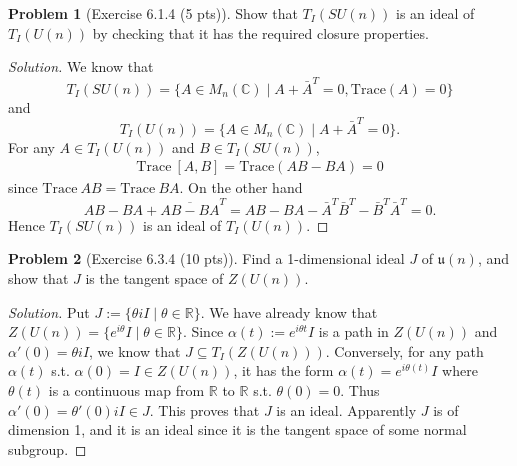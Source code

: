 \documentclass{article}
\theoremstyle{definition}
\newtheorem{problem}{Problem}
\theoremstyle{plain}
\begin{document}
\begin{problem}[Exercise 6.1.4 (5 pts)]
Show that $T_I(SU(n))$ is an ideal of $T_I(U(n))$ by checking that it has the required closure properties.
\end{problem}
\begin{adjustwidth}{0.7cm}{}
\color{blue}
\begin{proof}[Solution]
We know that
\begin{displaymath}
T_I(SU(n))=\{A\in M_n(\mathbb{C})\mid A+\bar{A}^T=0,\mathrm{Trace}(A)=0\}
\end{displaymath}
and
\begin{displaymath}
T_I(U(n))=\{A\in M_n(\mathbb{C})\mid A+\bar{A}^T=0\}.
\end{displaymath}
For any $A\in T_I(U(n))$ and $B\in T_I(SU(n))$,
\begin{align*}
\mathrm{Trace}~[A,B]=\mathrm{Trace}(AB-BA)=0
\end{align*}
since $\mathrm{Trace}~AB=\mathrm{Trace}~BA$. On the other hand
\begin{displaymath}
AB-BA+\overline{AB-BA}^T=AB-BA-\bar{A}^T\bar{B}^T-\bar{B}^T\bar{A}^T=0.
\end{displaymath}
Hence $T_I(SU(n))$ is an ideal of $T_I(U(n))$.
\color{black}
\end{proof}
\end{adjustwidth}

\begin{problem}[Exercise 6.3.4 (10 pts)]
Find a 1-dimensional ideal $J$ of $\mathfrak{u}(n)$, and show that $J$ is the tangent space of $Z(U(n))$.
\end{problem}
\begin{adjustwidth}{0.7cm}{}
\color{blue}
\begin{proof}[Solution]
Put $J:=\{\theta iI\mid\theta\in\mathbb{R}\}$. We have already know that $Z(U(n))=\{e^{i\theta}I\mid \theta\in\mathbb{R}\}$. Since $\alpha(t):=e^{i\theta t}I$ is a path in $Z(U(n))$ and $\alpha'(0)=\theta iI$, we know that $J\subseteq T_I(Z(U(n)))$. Conversely, for any path $\alpha(t)$ s.t. $\alpha(0)=I\in Z(U(n))$, it has the form $\alpha(t)=e^{i\theta(t)}I$ where $\theta(t)$ is a continuous map from $\mathbb{R}$ to $\mathbb{R}$ s.t. $\theta(0)=0$. Thus $\alpha'(0)=\theta'(0)iI\in J$. This proves that $J$ is an ideal. Apparently $J$ is of dimension 1, and it is an ideal since it is the tangent space of some normal subgroup.
\color{black}
\end{proof}
\end{adjustwidth}
\end{document}
